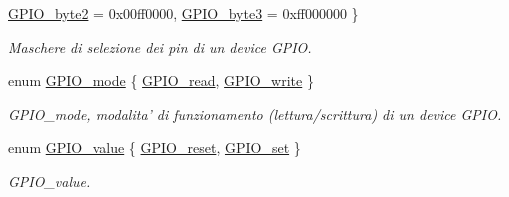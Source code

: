 \begin{DoxyCompactItemize}
\hyperlink{group___g_p_i_o_gga6d5aef8a8a54ee2f602d47252ff66595acf385bd78e3d36725f9d82955fce5fcf}{G\+P\+I\+O\+\_\+byte2} = 0x00ff0000, 
\hyperlink{group___g_p_i_o_gga6d5aef8a8a54ee2f602d47252ff66595adf78991a114e960df39d947c450de88c}{G\+P\+I\+O\+\_\+byte3} = 0xff000000
 \}
\begin{DoxyCompactList}\small\item\em Maschere di selezione dei pin di un device G\+P\+I\+O. \end{DoxyCompactList}\item 
enum \hyperlink{group___g_p_i_o_ga894e6ae857ed4a9aedd04fff44a6770e}{G\+P\+I\+O\+\_\+mode} \{ \hyperlink{group___g_p_i_o_gga894e6ae857ed4a9aedd04fff44a6770ea3db3c7d228d9b87cc125c8974241c800}{G\+P\+I\+O\+\_\+read}, 
\hyperlink{group___g_p_i_o_gga894e6ae857ed4a9aedd04fff44a6770eab1b932c1d800b09eb45b7ff5750bf73c}{G\+P\+I\+O\+\_\+write}
 \}
\begin{DoxyCompactList}\small\item\em G\+P\+I\+O\+\_\+mode, modalita' di funzionamento (lettura/scrittura) di un device G\+P\+I\+O. \end{DoxyCompactList}\item 
enum \hyperlink{group___g_p_i_o_ga495d9a7aa735fe416a3f110337c54967}{G\+P\+I\+O\+\_\+value} \{ \hyperlink{group___g_p_i_o_gga495d9a7aa735fe416a3f110337c54967a93cbe0e318453de590a9cb0030a840fa}{G\+P\+I\+O\+\_\+reset}, 
\hyperlink{group___g_p_i_o_gga495d9a7aa735fe416a3f110337c54967a39769e54aa8c4b6fbad0ef4ae88b5c44}{G\+P\+I\+O\+\_\+set}
 \}
\begin{DoxyCompactList}\small\item\em G\+P\+I\+O\+\_\+value. \end{DoxyCompactList}\end{DoxyCompactItemize}

